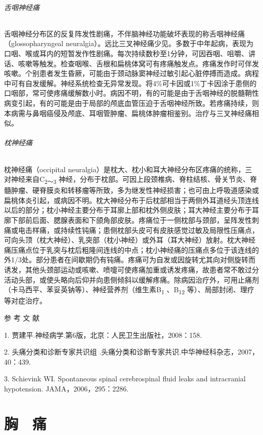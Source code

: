 \subparagraph{舌咽神经痛}

舌咽神经分布区的反复阵发性剧痛，不伴脑神经功能破坏表现的称舌咽神经痛（glossopharyngeal
neuralgia）。远比三叉神经痛少见。多数于中年起病，表现为口咽、喉或耳内的短暂发作性剧痛。每次持续数秒至1分钟，可因吞咽、咀嚼、讲话、咳嗽等触发。检查咽喉、舌根和扁桃体窝可有疼痛触发点。疼痛发作时可伴发咳嗽。个别患者发生昏厥，可能由于颈动脉窦神经过敏引起心脏停搏而造成。病程中可有自发缓解。神经系统检查无异常发现。将4\%可卡因或1\%丁卡因涂于患侧的口咽部，常可使疼痛缓解数小时。病因不明，有的可能是由于舌咽神经的脱髓鞘性病变引起，有的可能是由于局部的颅底血管压迫于舌咽神经所致。若疼痛持续，则本病需与鼻咽癌侵及颅底、耳咽管肿瘤、扁桃体肿瘤相鉴别。治疗与三叉神经痛相似。

\subparagraph{枕神经痛}

枕神经痛（occipital
neuralgia）是枕大、枕小和耳大神经分布区疼痛的统称，三对神经来自C\textsubscript{2～3}
神经，分布于枕部。可因上段颈椎病、脊柱结核、骨关节炎、脊髓肿瘤、硬脊膜炎和转移瘤等所致，多为继发性神经损害；也可由上呼吸道感染或扁桃体炎引起，或病因不明。枕大神经分布于后枕部相当于两侧外耳道经头顶连线以后的部分；枕小神经主要分布于耳廓上部和枕外侧皮肤；耳大神经主要分布于耳廓下部前后面、腮腺表面和下颌角部皮肤。疼痛位于一侧枕部与颈部，呈阵发性刺痛或电击样痛，或持续性钝痛；患侧枕部头皮可有皮肤感觉过敏及局限性压痛点，可向头顶（枕大神经）、乳突部（枕小神经）或外耳（耳大神经）放射。枕大神经痛压痛点位于乳突与枕后粗隆间连线的中点；枕小神经痛的压痛点多位于该连线的外1/3处。部分患者在间歇期仍有钝痛。疼痛可为自发或因旋转尤其向对侧旋转而诱发，其他头颈部运动或咳嗽、喷嚏可使疼痛加重或诱发疼痛，故患者常不敢过分活动头部，或使头略向后仰并向患侧倾斜以缓解疼痛。除病因治疗外，可用止痛剂（卡马西平、苯妥英钠等）、神经营养剂（维生素B\textsubscript{1}
、B\textsubscript{12} 等）、局部封闭、理疗等对症治疗。


\hypertarget{text00021.htmlux5cux23CHP1-7-5}{}
参 考 文 献

1. 贾建平.神经病学.第6版，北京：人民卫生出版社，2008：158.

2. 头痛分类和诊断专家共识组
.头痛分类和诊断专家共识.中华神经科杂志，2007，40：439.

3. Schievink WI. Spontaneous spinal cerebrospinal fluid leaks and
intracranial hypotension. JAMA，2006，295：2286.

\protect\hypertarget{text00022.html}{}{}

\chapter{胸　痛}

